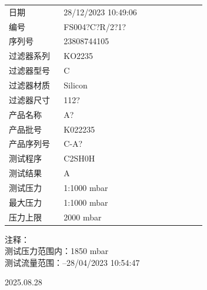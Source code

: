 \documentclass[UTF8,10pt,a4paper,fontset=fandol]{ctexart}
\newcommand{\fieldvalue}[1]{#1}
\newcommand{\handwritten}[1]{#1}
\begin{document}
\begin{tabular}{@{}p{0.25\linewidth}p{0.65\linewidth}@{}}
日期 &
\fieldvalue{28/12/2023 10:49:06}
\\[2pt]
编号 &
\fieldvalue{FS004?C?R/2?1?}
\\[2pt]
序列号 &
\fieldvalue{23808744105}
\\[2pt]
过滤器系列 &
\fieldvalue{KO2235}
\\[2pt]
过滤器型号 &
\fieldvalue{C}
\\[2pt]
过滤器材质 &
\fieldvalue{Silicon}
\\[2pt]
过滤器尺寸 &
\fieldvalue{112?}
\\[2pt]
产品名称 &
\fieldvalue{A?}
\\[2pt]
产品批号 &
\fieldvalue{K022235}
\\[2pt]
产品序列号 &
\fieldvalue{C-A?}
\\[2pt]
测试程序 &
\fieldvalue{C2SH0H}
\\[2pt]
测试结果 &
\fieldvalue{A}
\\[2pt]
测试压力 &
\fieldvalue{1:1000 mbar}
\\[2pt]
最大压力 &
\fieldvalue{1:1000 mbar}
\\[2pt]
压力上限 &
\fieldvalue{2000 mbar}
\end{tabular}

\vspace{1em}

\noindent
注释：\\
测试压力范围内：1850 mbar\\
测试流量范围：--28/04/2023 10:54:47

\vspace{1em}

\fieldvalue{\handwritten{2025.08.28}}
\end{document}
